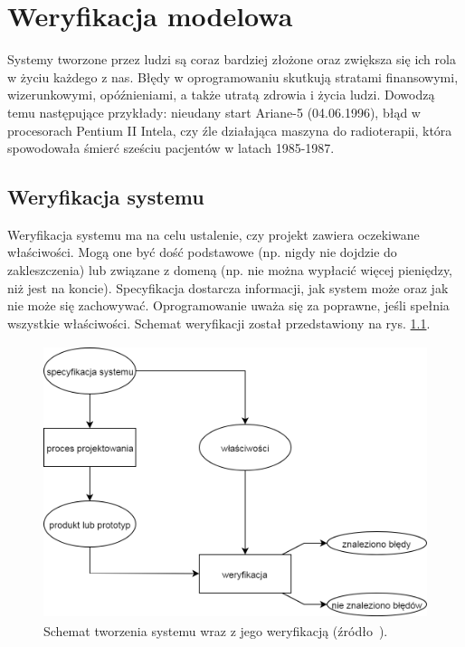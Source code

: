 \chapter{Weryfikacja modelowa}

Systemy tworzone przez ludzi są coraz bardziej złożone oraz zwiększa się ich rola w życiu każdego z nas.
Błędy w oprogramowaniu skutkują stratami finansowymi, wizerunkowymi, opóźnieniami, a także utratą zdrowia i życia ludzi. Dowodzą temu następujące przykłady: nieudany start Ariane-5 (04.06.1996), błąd w procesorach Pentium II Intela, czy źle działająca maszyna do radioterapii, która spowodowała śmierć sześciu pacjentów w latach 1985-1987.


\section{Weryfikacja systemu}

Weryfikacja systemu ma na celu ustalenie, czy projekt zawiera oczekiwane właściwości. Mogą one być dość podstawowe (np. nigdy nie dojdzie do zakleszczenia) lub związane z domeną (np. nie można wypłacić więcej pieniędzy, niż jest na koncie). Specyfikacja dostarcza informacji, jak system może oraz jak nie może się zachowywać. Oprogramowanie uważa się za poprawne, jeśli spełnia wszystkie właściwości. Schemat weryfikacji został przedstawiony na rys. \ref{fig:system_verification_scheme}.

\begin{figure}[h]
    \centering
    \includegraphics[height=8cm,keepaspectratio]{img/system_verification_schematic_view.png}
    \caption{Schemat tworzenia systemu wraz z jego weryfikacją (źródło~\cite{Bai08}).}
    \label{fig:system_verification_scheme}
\end{figure}


